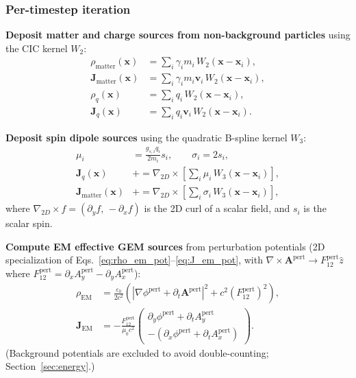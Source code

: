 \documentclass[11pt,a4paper]{article}
\newcommand{\vv}[1]{\mathbf{#1}}
\begin{document}
\subsubsection*{Per-timestep iteration}

\begin{algsteps}
  \item \textbf{Deposit matter and charge sources from non-background particles} using the CIC kernel $W_2$:
  \begin{align}
    \rho_{\mathrm{matter}}(\vv{x}) &= \sum_i \gamma_i m_i\,W_2(\vv{x}-\vv{x}_i), \\
    \vv{J}_{\mathrm{matter}}(\vv{x}) &= \sum_i \gamma_i m_i\vv{v}_i\,W_2(\vv{x}-\vv{x}_i), \\
    \rho_q(\vv{x}) &= \sum_i q_i\,W_2(\vv{x}-\vv{x}_i), \\
    \vv{J}_q(\vv{x}) &= \sum_i q_i\vv{v}_i\,W_2(\vv{x}-\vv{x}_i).
  \end{align}

  \item \textbf{Deposit spin dipole sources} using the quadratic B-spline kernel $W_3$:
  \begin{align}
    \mu_i    &= \frac{g_{s,i} q_i}{2m_i} s_i, \qquad \sigma_i = 2 s_i, \\
    \vv{J}_q(\vv{x}) &\mathrel{+}= \nabla_{2D}\times\!\left[\sum_i \mu_i\,W_3(\vv{x}-\vv{x}_i)\right], \\
    \vv{J}_{\mathrm{matter}}(\vv{x}) &\mathrel{+}= \nabla_{2D}\times\!\left[\sum_i \sigma_i\,W_3(\vv{x}-\vv{x}_i)\right],
  \end{align}
  where $\nabla_{2D}\times f = (\partial_y f,\,-\partial_x f)$ is the 2D curl of a scalar field, and $s_i$ is the scalar spin.

  \item \textbf{Compute EM effective GEM sources} from perturbation potentials (2D specialization of Eqs.~\ref{eq:rho_em_pot}--\ref{eq:J_em_pot}, with $\nabla\times\vv{A}^{\mathrm{pert}} \to F_{12}^{\mathrm{pert}}\hat{z}$ where $F_{12}^{\mathrm{pert}} = \partial_x A_y^{\mathrm{pert}} - \partial_y A_x^{\mathrm{pert}}$):
  \begin{align}
    \rho_{\mathrm{EM}} &= \frac{\varepsilon_0}{2c^2}\!\left(|\nabla\phi^{\mathrm{pert}} + \partial_t\vv{A}^{\mathrm{pert}}|^2
      + c^2 (F_{12}^{\mathrm{pert}})^2\right), \\
    \vv{J}_{\mathrm{EM}} &= -\frac{F_{12}^{\mathrm{pert}}}{\mu_0 c^2}
      \begin{pmatrix} \partial_y\phi^{\mathrm{pert}} + \partial_t A_y^{\mathrm{pert}} \\ -(\partial_x\phi^{\mathrm{pert}} + \partial_t A_x^{\mathrm{pert}}) \end{pmatrix}.
  \end{align}
  (Background potentials are excluded to avoid double-counting; Section~\ref{sec:energy}.)


\end{algsteps}
\end{document}
